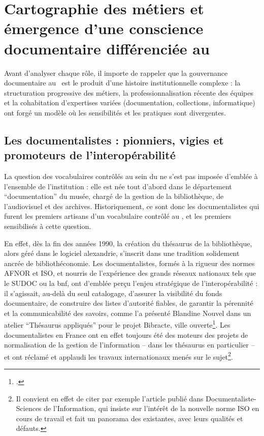 \section{\label{II-B-1}Cartographie des métiers et émergence d’une conscience documentaire différenciée au \mae}

Avant d’analyser chaque rôle, il importe de rappeler que la gouvernance documentaire au \mae~est le produit d’une histoire institutionnelle complexe : la structuration progressive des métiers, la professionnalisation récente des équipes et la cohabitation d’expertises variées (documentation, collections, informatique) ont forgé un modèle où les sensibilités et les pratiques sont divergentes.

\subsection{Les documentalistes : pionniers, vigies et promoteurs de l’interopérabilité}

La question des vocabulaires contrôlés au sein du \mae ne s’est pas imposée d’emblée à l’ensemble de l’institution : elle est née tout d'abord dans le département \enquote{documentation} du musée, chargé de la gestion de la bibliothèque, de l'audiovisuel et des archives. Historiquement, ce sont donc les documentalistes qui furent les premiers artisans d'un vocabulaire contrôlé au \mae, et les premiers sensibilisés à cette question.

En effet, dès la fin des années 1990, la création du thésaurus de la bibliothèque, alors géré dans le logiciel \gls{alexandrie}, s’inscrit dans une tradition solidement ancrée de bibliothéconomie. Les documentalistes, formés à la rigueur des normes AFNOR et ISO, et nourris de l’expérience des grands réseaux nationaux tels que le SUDOC ou la \ac{bnf}, ont d’emblée perçu l’enjeu stratégique de l’interopérabilité : il s’agissait, au-delà du seul catalogage, d’assurer la visibilité du fonds documentaire, de construire des listes d’autorité fiables, de garantir la pérennité et la communicabilité des savoirs, comme l'a présenté Blandine Nouvel dans un atelier \enquote{Thésaurus appliqués} pour le projet Bibracte, ville ouverte\footcite{nouvelOutilsDindexationBibliothecaires2022}. Les documentalistes en France ont en effet toujours été des moteurs des projets de normalisation de la gestion de l'information -- dans les thésaurus en particulier -- et ont réclamé et applaudi les travaux internationaux menés sur le sujet\footnote{Il convient en effet de citer par exemple l'article  publié dans Documentaliste-Sciences de l'Information, qui insiste sur l'intérêt de la nouvelle norme ISO en cours de travail et fait un panorama des existantes, avec leurs qualités et défauts.}.

